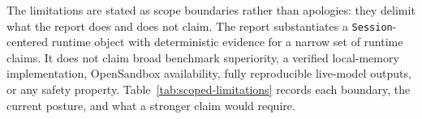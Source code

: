 
The limitations are stated as scope boundaries rather than apologies: they
delimit what the report does and does not claim. The report substantiates a
\texttt{Session}-centered runtime object with deterministic evidence for a
narrow set of runtime claims. It does not claim broad benchmark superiority, a
verified local-memory implementation, OpenSandbox availability, fully
reproducible live-model outputs, or any safety property.
Table~\ref{tab:scoped-limitations} records each boundary, the current posture,
and what a stronger claim would require.


